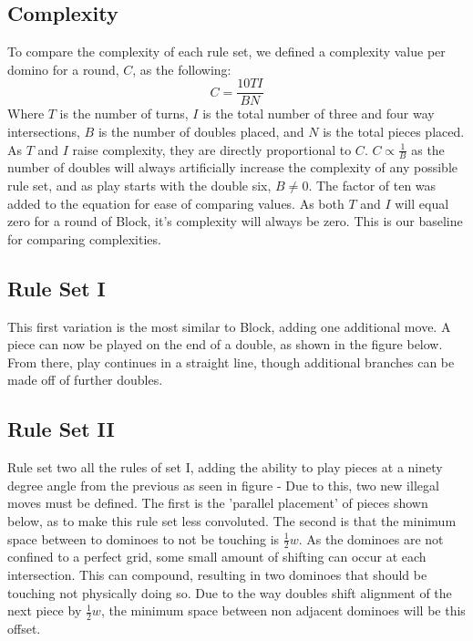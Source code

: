 \documentclass{article}
\begin{document}
\subsection{Complexity}
To compare the complexity of each rule set, we defined a complexity value per domino for a round, \(C\), as the following:
\begin{equation}\label{Eqn1}
    C=\frac{10TI}{BN}
\end{equation}
Where \(T\) is the number of turns, \(I\) is the total number of three and four way intersections, \(B\) is the number of doubles placed, and \(N\) is the total pieces placed. As \(T\) and \(I\) raise complexity, they are directly proportional to \(C\). \(C\propto\frac{1}{B}\) as the number of doubles will always artificially increase the complexity of any possible rule set, and as play starts with the double six, \(B\neq0\). The factor of ten was added to the equation for ease of comparing values. As both \(T\) and \(I\) will equal zero for a round of Block, it's complexity will always be zero. This is our baseline for comparing complexities. 

\subsection{Rule Set I}
This first variation is the most similar to Block, adding one additional move. A piece can now be played on the end of a double, as shown in the figure below. %
From there, play continues in a straight line, though additional branches can be made off of further doubles.

\subsection{Rule Set II}
Rule set two all the rules of set I, adding the ability to play pieces at a ninety degree angle from the previous as seen in figure - %
Due to this, two new illegal moves must be defined. The first is the 'parallel placement' of pieces shown below, as to make this rule set less convoluted. The second is that the minimum space between to dominoes to not be touching is \(\frac{1}{2}w\). As the dominoes are not confined to a perfect grid, some small amount of shifting can occur at each intersection. This can compound, resulting in two dominoes that should be touching not physically doing so. Due to the way doubles shift alignment of the next piece by \(\frac{1}{2}w\), the minimum space between non adjacent dominoes will be this offset.
\end{document}
